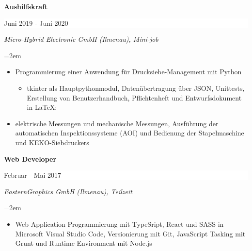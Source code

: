 \documentclass[paper=a4,fontsize=10.9pt]{scrartcl} %
\newcommand{\sepspace}{\vspace*{0.5em}}		%
\newcommand{\EducationEntry}[4]{
		\noindent \textbf{#1} \hfill      %
		\colorbox{White}{%
			\parbox{16em}{%
			\hfill\color{Black}#2}} \par  %
		\noindent \textit{#3} \par        %
		\noindent\hangindent=2em\hangafter=0 \small #4 %
		\normalsize \par}
\begin{document}
\EducationEntry{\color[HTML]{6a040f}Aushilfskraft}{Juni 2019 - Juni 2020}{Micro-Hybrid Electronic GmbH (Ilmenau), Mini-job}{
	\begin{itemize}
		\item{Programmierung einer Anwendung für Drucksiebe-Management mit Python}
		\begin{itemize}
			\item{tkinter als Hauptpythonmodul, Datenübertragung über JSON, Unittests, Erstellung von Benutzerhandbuch, Pflichtenheft und Entwurfsdokument in \LaTeX:}

		\end{itemize}
		\item{elektrische Messungen und mechanische Messungen, Ausführung der automatischen Inspektionssysteme (AOI) und Bedienung der Stapelmaschine und KEKO-Siebdruckers}
	\end{itemize}}
\sepspace
	
\EducationEntry{\color[HTML]{6a040f}Web Developer}{Februar - Mai 2017}{EasternGraphics GmbH (Ilmenau), Teilzeit}{
	\begin{itemize}
		\item{Web Application Programmierung mit TypeSript, React und SASS in Microsoft Visual Studio Code, Versionierung mit Git, JavaScript Tasking mit Grunt und Runtime Environment mit Node.js}
\end{itemize}}













\end{document}
